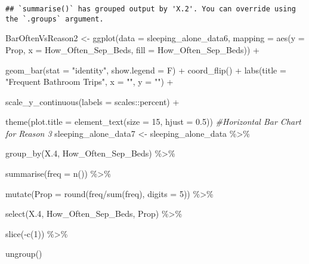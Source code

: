 \documentclass[
]{article}
\newenvironment{Shaded}{\begin{snugshade}}{\end{snugshade}}
\newcommand{\AttributeTok}[1]{\textcolor[rgb]{0.77,0.63,0.00}{#1}}
\newcommand{\CommentTok}[1]{\textcolor[rgb]{0.56,0.35,0.01}{\textit{#1}}}
\newcommand{\DecValTok}[1]{\textcolor[rgb]{0.00,0.00,0.81}{#1}}
\newcommand{\FloatTok}[1]{\textcolor[rgb]{0.00,0.00,0.81}{#1}}
\newcommand{\FunctionTok}[1]{\textcolor[rgb]{0.00,0.00,0.00}{#1}}
\newcommand{\NormalTok}[1]{#1}
\newcommand{\OtherTok}[1]{\textcolor[rgb]{0.56,0.35,0.01}{#1}}
\newcommand{\SpecialCharTok}[1]{\textcolor[rgb]{0.00,0.00,0.00}{#1}}
\newcommand{\StringTok}[1]{\textcolor[rgb]{0.31,0.60,0.02}{#1}}
\begin{document}
\begin{verbatim}
## `summarise()` has grouped output by 'X.2'. You can override using the `.groups` argument.
\end{verbatim}

\begin{Shaded}
\begin{Highlighting}[]
\NormalTok{BarOftenVsReason2 }\OtherTok{\textless{}{-}} \FunctionTok{ggplot}\NormalTok{(}\AttributeTok{data =}\NormalTok{ sleeping\_alone\_data6,}
                               \AttributeTok{mapping =} \FunctionTok{aes}\NormalTok{(}\AttributeTok{y =}\NormalTok{ Prop,}
                                             \AttributeTok{x =}\NormalTok{ How\_Often\_Sep\_Beds,}
                                             \AttributeTok{fill =}\NormalTok{ How\_Often\_Sep\_Beds)) }\SpecialCharTok{+}
  
  \FunctionTok{geom\_bar}\NormalTok{(}\AttributeTok{stat =} \StringTok{"identity"}\NormalTok{,}
           \AttributeTok{show.legend =}\NormalTok{ F) }\SpecialCharTok{+} 
  \FunctionTok{coord\_flip}\NormalTok{() }\SpecialCharTok{+} 
  \FunctionTok{labs}\NormalTok{(}\AttributeTok{title =} \StringTok{"Frequent Bathroom Trips"}\NormalTok{,}
       \AttributeTok{x =} \StringTok{""}\NormalTok{,}
       \AttributeTok{y =} \StringTok{""}\NormalTok{) }\SpecialCharTok{+}
  
  \FunctionTok{scale\_y\_continuous}\NormalTok{(}\AttributeTok{labels =}\NormalTok{ scales}\SpecialCharTok{::}\NormalTok{percent) }\SpecialCharTok{+}
  
  \FunctionTok{theme}\NormalTok{(}\AttributeTok{plot.title =} \FunctionTok{element\_text}\NormalTok{(}\AttributeTok{size =} \DecValTok{15}\NormalTok{, }\AttributeTok{hjust =} \FloatTok{0.5}\NormalTok{))}
\CommentTok{\#Horizontal Bar Chart for Reason 3}
\NormalTok{sleeping\_alone\_data7 }\OtherTok{\textless{}{-}}\NormalTok{ sleeping\_alone\_data }\SpecialCharTok{\%\textgreater{}\%} 
  
  \FunctionTok{group\_by}\NormalTok{(X}\FloatTok{.4}\NormalTok{, How\_Often\_Sep\_Beds) }\SpecialCharTok{\%\textgreater{}\%} 
  
  \FunctionTok{summarise}\NormalTok{(}\AttributeTok{freq =} \FunctionTok{n}\NormalTok{()) }\SpecialCharTok{\%\textgreater{}\%} 
  
  \FunctionTok{mutate}\NormalTok{(}\AttributeTok{Prop =} \FunctionTok{round}\NormalTok{(freq}\SpecialCharTok{/}\FunctionTok{sum}\NormalTok{(freq), }\AttributeTok{digits =} \DecValTok{5}\NormalTok{)) }\SpecialCharTok{\%\textgreater{}\%} 
  
  \FunctionTok{select}\NormalTok{(X}\FloatTok{.4}\NormalTok{, How\_Often\_Sep\_Beds, Prop) }\SpecialCharTok{\%\textgreater{}\%} 
  
  \FunctionTok{slice}\NormalTok{(}\SpecialCharTok{{-}}\FunctionTok{c}\NormalTok{(}\DecValTok{1}\NormalTok{)) }\SpecialCharTok{\%\textgreater{}\%} 
  
  \FunctionTok{ungroup}\NormalTok{()}
\end{Highlighting}
\end{Shaded}
\end{document}
